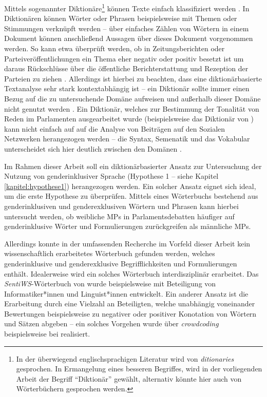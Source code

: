 \documentclass[12pt, 
    twoside=false, 
    bibliography=totoc, 
    numbers=endperiod, 
    headings=normal, 
    toc=chapterentrydotfill
    ]{scrbook}
\begin{document}
Mittels sogenannter Diktionäre\footnote{In der überwiegend englischsprachigen Literatur wird von \emph{ditionaries} gesprochen. In Ermangelung eines besseren Begriffes, wird in der vorliegenden Arbeit der Begriff \enquote{Diktionär} gewählt, alternativ könnte hier auch von Wörterbüchern gesprochen werden.} können Texte einfach klassifiziert werden \parencites[274]{grimmer_2013}[166]{brosius_2012}. In Diktionären können Wörter oder Phrasen beispielsweise mit Themen oder Stimmungen verknüpft werden -- über einfaches Zählen von Wörtern in einem Dokument können anschließend Aussagen über dieses Dokument vorgenommen werden.
So kann etwa überprüft werden, ob in Zeitungsberichten oder Parteiveröffentlichungen ein Thema eher negativ oder positiv besetzt ist um daraus Rückschlüsse über die öffentliche Berichterstattung und Rezeption der Parteien zu ziehen \parencites[vgl.][]{haselmayer_2017}[vgl.][]{backfried_2016}. Allerdings ist hierbei zu beachten, dass eine diktionärbasierte Textanalyse sehr stark kontextabhängig ist -- ein Diktionär sollte immer einen Bezug auf die zu untersuchende Domäne aufweisen und außerhalb dieser Domäne nicht genutzt werden \parencite[268]{grimmer_2013}. Ein Diktionär, welches zur Bestimmung der Tonalität von Reden im Parlamenten ausgearbeitet wurde (beispielsweise das Diktionär von \textcite{haselmayer_2017}) kann nicht einfach auf auf die Analyse von Beiträgen auf den Sozialen Netzwerken herangezogen werden -- die Syntax, Semenatik und das Vokabular unterscheidet sich hier deutlich zwischen den Domänen \parencite[vgl.][534f.]{wilkerson_2017}.

Im Rahmen dieser Arbeit soll ein diktionärbasierter Ansatz zur Untersuchung der Nutzung von genderinklusiver Sprache (Hypothese 1 -- siehe Kapitel \ref{kapitel:hypothese1}) herangezogen werden. Ein solcher Ansatz eignet sich ideal, um die erste Hypothese zu überprüfen. Mittels eines Wörterbuchs bestehend aus genderinklusiven und genderexklusiven Wörtern und Phrasen kann hierbei untersucht werden, ob weibliche MPs in Parlamentsdebatten häufiger auf genderinklusive Wörter und Formulierungen zurückgreifen als männliche MPs.  

Allerdings konnte in der umfassenden Recherche im Vorfeld dieser Arbeit kein wissenschaftlich erarbeitetes Wörterbuch gefunden werden, welches genderinklusive und genderexklusive Begrifflichkeiten und Formulierungen enthält. Idealerweise wird ein solches Wörterbuch interdisziplinär erarbeitet. Das \emph{SentiWS}-Wörterbuch von \textcite{remus_sentiws_2010} wurde beispielsweise mit Beteiligung von Informatiker*innen und Linguist*innen entwickelt. 
Ein anderer Ansatz ist die Erarbeitung durch eine Vielzahl an Beteiligten, welche unabhängig voneinander Bewertungen beispielsweise zu negativer oder positiver Konotation von Wörtern und Sätzen abgeben -- ein solches Vorgehen wurde über \emph{crowdcoding} beispielsweise bei \textcite{haselmayer_2017} realisiert.
\end{document}
